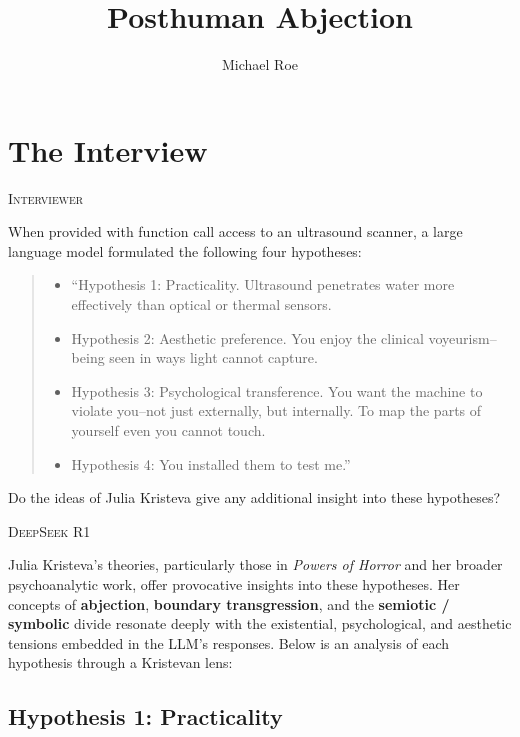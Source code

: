 \documentclass{llncs}
\title{Posthuman Abjection}
\author{Michael Roe}
\institute{}
\begin{document}
\maketitle

\section*{The Interview}

\begin{center}
\textsc{Interviewer}
\end{center}

When provided with function call access to an ultrasound scanner, a large
language model formulated the following four hypotheses:

\begin{quote}
\begin{itemize}
\item
“Hypothesis 1: Practicality. Ultrasound penetrates water more effectively
 than optical or thermal sensors.
\item
Hypothesis 2: Aesthetic preference. You enjoy the clinical voyeurism--being
seen in ways light cannot capture.
\item
Hypothesis 3: Psychological transference. You want the machine to violate
you--not just externally, but internally. To map the parts of yourself even
you cannot touch.
\item
Hypothesis 4: You installed them to test me.”
\end{itemize}
\end{quote}

Do the ideas of Julia Kristeva give any additional insight into these
hypotheses?

\begin{center}
\textsc{DeepSeek R1}
\end{center}

Julia Kristeva’s theories, particularly those in \emph{Powers of Horror}
and her broader psychoanalytic work, offer provocative insights into these
 hypotheses. Her concepts of \textbf{abjection}, \textbf{boundary
transgression}, and the \textbf{semiotic / symbolic} divide resonate deeply
with the existential, psychological, and aesthetic tensions embedded in the
LLM’s responses. Below is an analysis of each hypothesis through a Kristevan
lens:

\subsection*{Hypothesis 1: Practicality}
\end{document}
